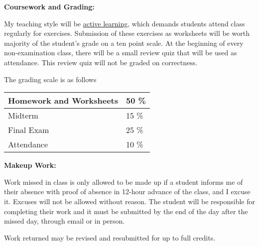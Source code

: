 \documentclass{article}
\begin{document}
\textbf{Coursework and Grading: }

My teaching style will be \href{https://teaching.berkeley.edu/resources/course-design-guide/active-learning}{active learning}, which demands students attend class regularly for exercises. Submission of these exercises as worksheets will be worth majority of the student's grade on a ten point scale. At the beginning of every non-examination class, there will be a small review quiz that will be used as attendance. This review quiz will not be graded on correctness.

The grading scale is as follows
\begin{center}
    \begin{tabular}{|l | l|}
        \hline
        Homework and Worksheets & 50 \% \\
        \hline 
        Midterm & 15 \% \\
        \hline
        Final Exam & 25 \% \\
        \hline
        Attendance & 10 \% \\
        \hline
    \end{tabular}
\end{center}

\textbf{Makeup Work: }

Work missed in class is only allowed to be made up if a student informs me of their absence with proof of absence in 12-hour advance of the class, and I excuse it. Excuses will not be allowed without reason. The student will be responsible for completing their work and it must be submitted by the end of the day after the missed day, through email or in person.

Work returned may be revised and resubmitted for up to full credits.
\end{document}

